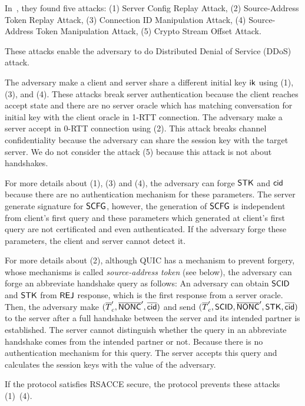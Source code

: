 In~\cite{LJBN15:QUIC}, they found five attacks:
(1) Server Config Replay Attack,
(2) Source-Address Token Replay Attack,
(3) Connection ID Manipulation Attack,
(4) Source-Address Token Manipulation Attack,
(5) Crypto Stream Offset Attack.

These attacks enable the adversary to do Distributed Denial of Service
(DDoS) attack.

The adversary make a client and server share a different
initial key $\mathsf{ik}$ using (1), (3), and (4).
These attacks break server authentication because the client
reaches accept state and there are no server oracle which has
matching conversation for initial key with the client oracle in 1-RTT connection.
The adversary make a server accept in 0-RTT connection
using (2).
This attack breaks channel confidentiality because the adversary
can share the session key with the target server.
We do not consider the attack (5) because this attack is not
about handshakes.

For more details about (1), (3) and (4), the adversary can forge
$\mathsf{STK}$ and $\mathsf{cid}$ because there are no authentication mechanism
for these parameters.
The server generate signature for $\mathsf{SCFG}$, however, the generation
of $\mathsf{SCFG}$ is independent from client's first query and these parameters
which generated at client's first query
are not certificated and even authenticated.
If the adversary forge these parameters, the client and server cannot
detect it.

For more details about (2), although QUIC has a mechanism to prevent forgery,
whose mechanisms is called \textit{source-address token}
(see below), the adversary can forge an abbreviate handshake
query as follows: An adversary can obtain $\mathsf{SCID}$ and $\mathsf{STK}$ from $\mathsf{REJ}$
response, which is the first response from a server oracle.
Then, the adversary make $(\overline{T}_c^{\prime},
\overline{\mathsf{NONC}}^{\prime}, \overline{\mathsf{cid}})$ and send $(\overline{T}_c^{\prime},
\mathsf{SCID}, \overline{\mathsf{NONC}}^{\prime}, \mathsf{STK}, \overline{\mathsf{cid}})$ to the server after a
full handshake between the server and its intended partner
is established.
The server cannot distinguish whether the query in an abbreviate handshake
comes from the intended partner or not. Because there is no
authentication mechanism for this query. The server accepts
this query and calculates the session keys with the value
of the adversary.

If the protocol satisfies RSACCE secure, the protocol prevents these attacks (1)~(4).


